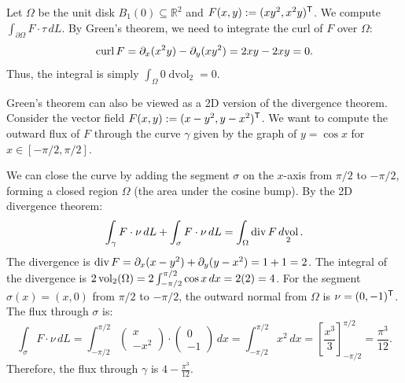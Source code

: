 \begin{example}
\label{ex:curl_free_greens}
Let $\Omega$ be the unit disk $B_1(0) \subseteq \mathbb{R}^2$ and $F(x,y) := (xy^2, x^2y)^{\mathsf{T}}$. We compute $\int_{\partial\Omega} F \cdot \tau \,dL$.
By Green's theorem, we need to integrate the curl of $F$ over $\Omega$:
\[\operatorname{curl} F = \partial_x(x^2y) - \partial_y(xy^2) = 2xy - 2xy = 0.\]
Thus, the integral is simply $\int_\Omega 0 \mathop{d\text{vol}}_2 = 0$.
\end{example}

\begin{example}
\label{ex:2d_divergence_theorem}
Green's theorem can also be viewed as a 2D version of the divergence theorem. Consider the vector field $F(x,y) := (x - y^2, y - x^2)^{\mathsf{T}}$. We want to compute the outward flux of $F$ through the curve $\gamma$ given by the graph of $y = \cos x$ for $x \in [-\pi/2, \pi/2]$.

We can close the curve by adding the segment $\sigma$ on the $x$-axis from $\pi/2$ to $-\pi/2$, forming a closed region $\Omega$ (the area under the cosine bump). By the 2D divergence theorem:
\[\int_{\gamma} F \cdot \nu \,dL + \int_{\sigma} F \cdot \nu \,dL = \int_\Omega \operatorname{div} F \mathop{d\text{vol}}_2.\]
The divergence is $\operatorname{div} F = \partial_x(x-y^2) + \partial_y(y-x^2) = 1 + 1 = 2$.
The integral of the divergence is $2 \operatorname{vol}_2(\Omega) = 2 \int_{-\pi/2}^{\pi/2} \cos x \,dx = 2(2) = 4$.
For the segment $\sigma(x) = (x, 0)$ from $\pi/2$ to $-\pi/2$, the outward normal from $\Omega$ is $\nu = (0, -1)^{\mathsf{T}}$. The flux through $\sigma$ is:
\[\int_{\sigma} F \cdot \nu \,dL = \int_{-\pi/2}^{\pi/2} \begin{pmatrix} x \\ -x^2 \end{pmatrix} \cdot \begin{pmatrix} 0 \\ -1 \end{pmatrix} \,dx = \int_{-\pi/2}^{\pi/2} x^2 \,dx = \left[ \frac{x^3}{3} \right]_{-\pi/2}^{\pi/2} = \frac{\pi^3}{12}.\]
Therefore, the flux through $\gamma$ is $4 - \frac{\pi^3}{12}$.
\end{example}

